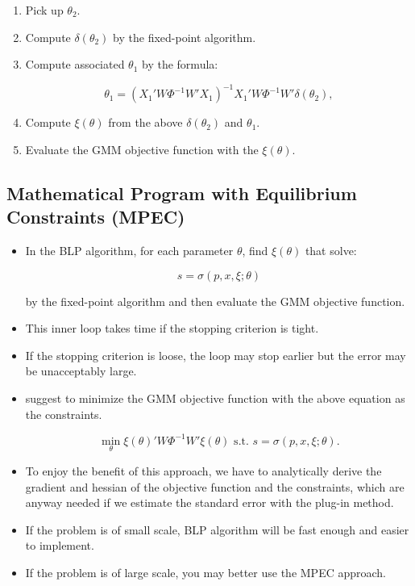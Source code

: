 \documentclass[]{book}
\providecommand{\tightlist}{%
  \setlength{\itemsep}{0pt}\setlength{\parskip}{0pt}}
\begin{document}
\begin{enumerate}
\def\labelenumi{\arabic{enumi}.}
\tightlist
\item
  Pick up \(\theta_2\).
\item
  Compute \(\delta(\theta_2)\) by the fixed-point algorithm.
\item
  Compute associated \(\theta_1\) by the formula:

  \begin{equation}
  \theta_1 = (X_1'W \Phi^{-1} W'X_1)^{-1} X_1' W \Phi^{-1} W' \delta(\theta_2),
  \end{equation}
\item
  Compute \(\xi(\theta)\) from the above \(\delta(\theta_2)\) and
  \(\theta_1\).
\item
  Evaluate the GMM objective function with the \(\xi(\theta)\).
\end{enumerate}

\subsection{Mathematical Program with Equilibrium Constraints
(MPEC)}\label{mathematical-program-with-equilibrium-constraints-mpec}

\begin{itemize}
\tightlist
\item
  In the BLP algorithm, for each parameter \(\theta\), find
  \(\xi(\theta)\) that solve:

  \begin{equation}
  s = \sigma(p, x, \xi; \theta)
  \end{equation}

  by the fixed-point algorithm and then evaluate the GMM objective
  function.
\item
  This inner loop takes time if the stopping criterion is tight.
\item
  If the stopping criterion is loose, the loop may stop earlier but the
  error may be unacceptably large.
\item
  \citet{Dube2012} suggest to minimize the GMM objective function with
  the above equation as the constraints.

  \begin{equation}
  \min_{\theta} \xi(\theta)' W \Phi^{-1} W' \xi(\theta) \text{   s.t.   } s = \sigma(p, x, \xi; \theta).
  \end{equation}
\item
  To enjoy the benefit of this approach, we have to analytically derive
  the gradient and hessian of the objective function and the
  constraints, which are anyway needed if we estimate the standard error
  with the plug-in method.
\item
  If the problem is of small scale, BLP algorithm will be fast enough
  and easier to implement.
\item
  If the problem is of large scale, you may better use the MPEC
  approach.
\end{itemize}
\end{document}
